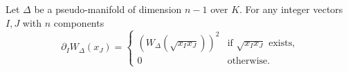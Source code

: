 \begin{theorem} \label{thm-PPconj}
Let $\Delta$ be a  pseudo-manifold of dimension $n-1$ over $K$. For any integer vectors $I, J$ with $n$ components
\[ \partial_I W_\Delta(x_J) = \begin{cases} 
(W_\Delta (\sqrt{x_I x_J}))^2 & \text{if $\sqrt{x_I x_J}$ exists,} \\
0 & \text{otherwise.}
\end{cases}
\]
\end{theorem}
